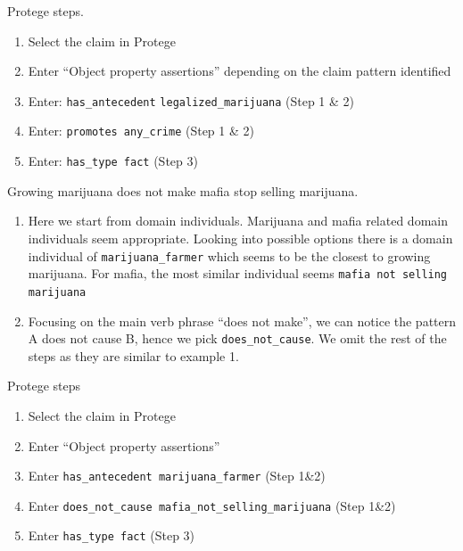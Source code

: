 \noindent Protege steps. 
\begin{enumerate}
\item Select the claim in Protege
\item Enter ``Object property assertions'' depending on the claim pattern identified 
\item Enter: \texttt{has\_antecedent} \texttt{legalized\_marijuana} (Step 1 \& 2)
\item Enter: \texttt{promotes any\_crime} (Step 1 \& 2)
\item Enter: \texttt{has\_type fact} (Step 3)
\end{enumerate}

\begin{mydef}
Growing marijuana does not make mafia stop selling marijuana.
\end{mydef}

\begin{enumerate}[label=\textbf{Step \arabic*.}, leftmargin=2cm, itemsep=0.5cm]
\item Here we start from domain individuals. Marijuana and mafia related domain
	individuals seem appropriate. Looking into possible options there is a
		domain individual of \texttt{marijuana\_farmer} which seems to be the
		closest to growing marijuana. For mafia, the most similar
		individual seems \texttt{mafia not selling marijuana}
\item  Focusing on the main verb phrase ``does not make'', we can notice the
	pattern A does not cause B, hence we pick \texttt{does\_not\_cause}. We omit the
		rest of the steps as they are similar to example 1. 
\end{enumerate}
Protege steps
\begin{enumerate}
\item Select the claim in Protege
\item Enter “Object property assertions”
\item Enter \texttt{has\_antecedent marijuana\_farmer} (Step 1\&2)
\item Enter \texttt{does\_not\_cause mafia\_not\_selling\_marijuana} (Step 1\&2)
\item Enter \texttt{has\_type fact} (Step 3)
\end{enumerate}

